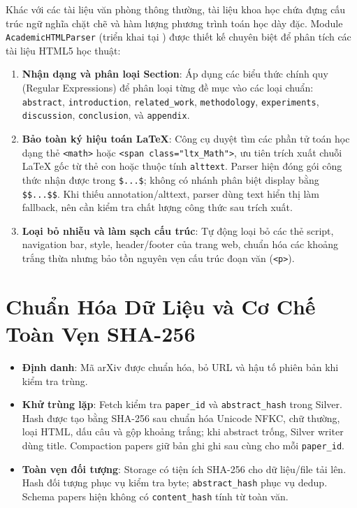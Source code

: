 Khác với các tài liệu văn phòng thông thường, tài liệu khoa học chứa đựng cấu trúc ngữ nghĩa chặt chẽ và hàm lượng phương trình toán học dày đặc. Module \texttt{AcademicHTMLParser} (triển khai tại ) được thiết kế chuyên biệt để phân tích các tài liệu HTML5 học thuật:

\begin{enumerate}[label=\alph*)]
  \item \textbf{Nhận dạng và phân loại Section}: Áp dụng các biểu thức chính quy (Regular Expressions) để phân loại từng đề mục vào các loại chuẩn: \texttt{abstract}, \texttt{introduction}, \texttt{related\_work}, \texttt{methodology}, \texttt{experiments}, \texttt{discussion}, \texttt{conclusion}, và \texttt{appendix}.
  \item \textbf{Bảo toàn ký hiệu toán LaTeX}: Công cụ duyệt tìm các phần tử toán học dạng thẻ \texttt{<math>} hoặc \texttt{<span class="ltx\_Math">}, ưu tiên trích xuất chuỗi LaTeX gốc từ thẻ con  hoặc thuộc tính \texttt{alttext}. Parser hiện đóng gói công thức nhận được trong \lstinline{$...$}; không có nhánh phân biệt display bằng \lstinline{$$...$$}. Khi thiếu annotation/alttext, parser dùng text hiển thị làm fallback, nên cần kiểm tra chất lượng công thức sau trích xuất.
  \item \textbf{Loại bỏ nhiễu và làm sạch cấu trúc}: Tự động loại bỏ các thẻ script, navigation bar, style, header/footer của trang web, chuẩn hóa các khoảng trắng thừa nhưng bảo tồn nguyên vẹn cấu trúc đoạn văn (\texttt{<p>}).
\end{enumerate}

\section{Chuẩn Hóa Dữ Liệu và Cơ Chế Toàn Vẹn SHA-256}
\begin{itemize}
\item \textbf{Định danh}: Mã arXiv được chuẩn hóa, bỏ URL và hậu tố phiên bản khi kiểm tra trùng.
\item \textbf{Khử trùng lặp}: Fetch kiểm tra \texttt{paper\_id} và \texttt{abstract\_hash} trong Silver. Hash được tạo bằng SHA-256 sau chuẩn hóa Unicode NFKC, chữ thường, loại HTML, dấu câu và gộp khoảng trắng; khi abstract trống, Silver writer dùng title. Compaction papers giữ bản ghi ghi sau cùng cho mỗi \texttt{paper\_id}.
\item \textbf{Toàn vẹn đối tượng}: Storage có tiện ích SHA-256 cho dữ liệu/file tải lên. Hash đối tượng phục vụ kiểm tra byte; \texttt{abstract\_hash} phục vụ dedup. Schema papers hiện không có \texttt{content\_hash} tính từ toàn văn.
\end{itemize}

